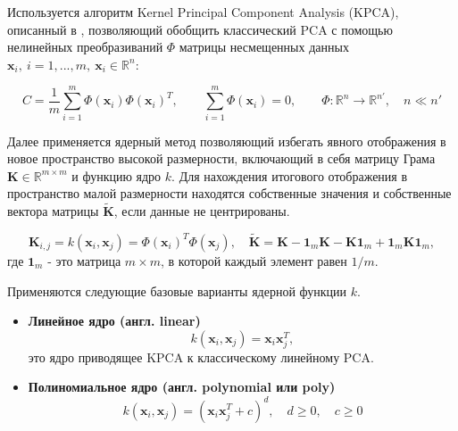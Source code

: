 \documentclass[12pt,twoside]{article}
\begin{document}
Используется алгоритм Kernel Principal Component Analysis (KPCA), описанный в \cite{Scholkopf1998, Ezukwoke2019}, позволяющий обобщить классический PCA с помощью нелинейных преобразиваний $\Phi$ матрицы несмещенных данных $\mathbf{x}_i, ~i=1,...,m,~\mathbf{x}_i \in \mathbb{R}^n$:

\begin{equation}
	 C = \frac{1}{m}\sum_{i=1}^{m}\Phi(\mathbf{x}_i) \Phi(\mathbf{x}_i)^T,
	 \qquad \sum_{i=1}^{m}\Phi(\mathbf{x}_i) = 0,
	 \qquad \Phi: \mathbb{R}^{n} \xrightarrow{} \mathbb{R}^{n'},
	 \quad n\ll n'
\label{eq:kpca}
\end{equation}

Далее применяется ядерный метод позволяющий избегать явного отображения в новое пространство высокой размерности, включающий в себя матрицу Грама $\mathbf{K} \in \mathbb{R}^{m \times m}$ и функцию ядро $k$. Для нахождения итогового отображения в пространство малой размерности находятся собственные значения и собственные вектора матрицы $\mathbf{\tilde K}$, если данные не центрированы. 

\begin{equation}
	 \mathbf{K}_{i,j} = k(\mathbf{x}_i,\mathbf{x}_j) = \Phi(\mathbf{x}_i)^T\Phi(\mathbf{x}_j),
	 \quad \mathbf{\tilde K} = \mathbf{K} - \mathbf{1}_m\mathbf{K} - \mathbf{K} \mathbf{1}_m  +\mathbf{1}_m\mathbf{K}\mathbf{1}_m,
\label{eq:K_matrix}
\end{equation}
где  $\mathbf{1}_m$ - это матрица $m\times m$, в которой каждый элемент равен $1/m$.

Применяются следующие базовые варианты ядерной функции $k$.

\begin{itemize}
\item \textbf{Линейное ядро (англ. linear)}
\begin{equation}
	k(\mathbf{x}_i,\mathbf{x}_j) = \mathbf{x}_i\mathbf{x}_j^T,
\label{eq:kernel_linear}
\end{equation}
это ядро приводящее KPCA к классическому линейному PCA.
\end{itemize}

\begin{itemize}
\item \textbf{Полиномиальное ядро (англ. polynomial или poly)}
\begin{equation}
	k(\mathbf{x}_i,\mathbf{x}_j) = (\mathbf{x}_i\mathbf{x}_j^T + c)^d,
	\quad d \ge 0,
	\quad c \ge 0
\label{eq:kernel_poly}
\end{equation}
\end{itemize}
\end{document}
